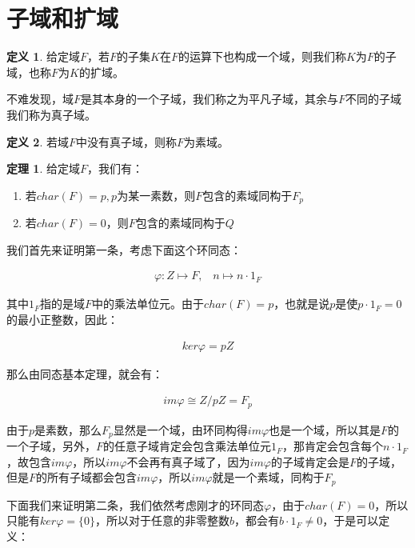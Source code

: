 \documentclass[12pt, a4paper, oneside]{ctexart}
\theoremstyle{definition}
\newtheorem*{definition}{定义}
\newtheorem*{theorem}{定理}
\begin{document}
\section*{子域和扩域}

\begin{definition}
给定域$F$，若$F$的子集$K$在$F$的运算下也构成一个域，则我们称$K$为$F$的子域，也称$F$为$K$的扩域。
\end{definition}

不难发现，域$F$是其本身的一个子域，我们称之为平凡子域，其余与$F$不同的子域我们称为真子域。

\begin{definition}
若域$F$中没有真子域，则称$F$为素域。
\end{definition}

\begin{theorem}
给定域$F$，我们有：
\begin{enumerate}
\item 若$char(F)=p,p$为某一素数，则$F$包含的素域同构于$F_p$
\item 若$char(F)=0$，则$F$包含的素域同构于$Q$
\end{enumerate}
\end{theorem}

我们首先来证明第一条，考虑下面这个环同态：

\begin{align*}
\varphi:Z\mapsto F,\;\;\; n\mapsto n\cdot 1_F
\end{align*}

其中$1_F$指的是域$F$中的乘法单位元。由于$char(F)=p$，也就是说$p$是使$p\cdot 1_F=0$的最小正整数，因此：

\begin{align*}
ker\varphi=pZ
\end{align*}

那么由同态基本定理，就会有：

\begin{align*}
im\varphi \cong Z/pZ=F_p
\end{align*}

由于$p$是素数，那么$F_p$显然是一个域，由环同构得$im\varphi$也是一个域，所以其是$F$的一个子域，另外，$F$的任意子域肯定会包含乘法单位元$1_F$，那肯定会包含每个$n\cdot 1_F$，故包含$im\varphi$，所以$im\varphi$不会再有真子域了，因为$im\varphi$的子域肯定会是$F$的子域，但是$F$的所有子域都会包含$im\varphi$，所以$im\varphi$就是一个素域，同构于$F_p$

下面我们来证明第二条，我们依然考虑刚才的环同态$\varphi$，由于$char(F)=0$，所以只能有$ker\varphi=\{0\}$，所以对于任意的非零整数$b$，都会有$b\cdot 1_F\neq 0$，于是可以定义：
\end{document}
